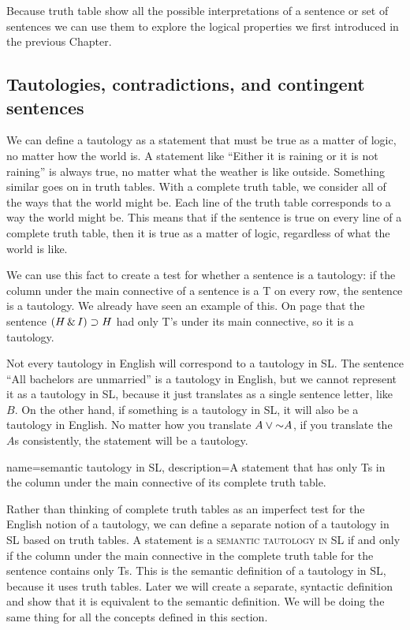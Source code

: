 Because truth table show all the possible interpretations of a sentence or set of sentences we can use 
them to explore the logical properties we first introduced in the previous Chapter.

\subsection{Tautologies, contradictions, and contingent sentences}
We can define a tautology as a statement that must be true as a matter of logic, no matter how the world is. A statement like ``Either it is raining or it is not raining'' is always true, no matter what the weather is like outside. Something similar goes on in truth tables. With a complete truth table, we consider all of the ways that the world might be. Each line of the truth table corresponds to a way the world might be. This means that if the sentence is true on every line of a complete truth table, then it is true as a matter of logic, regardless of what the world is like.

We can use this fact to create a test for whether a sentence is a tautology: if the column under the main connective of a sentence is a T on every row, the sentence is a tautology. We already have seen an example of this. On page \pageref{tautology3.1} that the sentence $(H \,\&\, I)\supset H$ had only T's under its main connective, so it is a tautology.

Not every tautology in English will correspond to a tautology in SL. The sentence ``All bachelors are unmarried'' is a tautology in English, but we cannot represent it as a tautology in SL, because it just translates as a single sentence letter, like $B$. On the other hand, if something is a tautology in SL, it will also be a tautology in English. No matter how you translate $A \vee \mathord{\sim} A$, if you translate the $A$s consistently, the statement will be a tautology. 

{
name=semantic tautology in SL,
description={A statement that has only Ts in the column under the main connective of its complete truth table.}
}

\label{semantic_definitions_in_SL}
Rather than thinking of complete truth tables as an imperfect test for the English notion of a tautology, we can define a separate notion of a tautology in SL based on truth tables. A statement is a \textsc{\gls{semantic tautology in SL}} \label{def:semantic_tautology_in_sl} if and only if the column  under the main connective in the complete truth table for the sentence contains only Ts. This is the semantic definition of a tautology in SL, because it uses truth tables. Later we will create a separate, syntactic definition and show that it is equivalent to the semantic definition. We will be doing the same thing for all the concepts defined in this section. 

